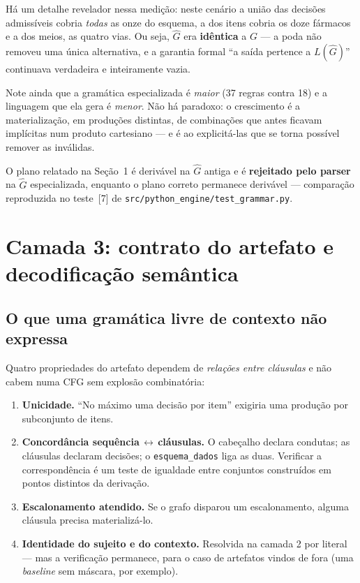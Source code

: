 \documentclass[11pt,a4paper]{article}
\begin{document}
Há um detalhe revelador nessa medição: neste cenário a união das decisões
admissíveis cobria \emph{todas} as onze do esquema, a dos itens cobria os doze
fármacos e a dos meios, as quatro vias. Ou seja, $\hat{G}$ era \textbf{idêntica}
a $G$ --- a poda não removeu uma única alternativa, e a garantia formal ``a saída
pertence a $L(\hat{G})$'' continuava verdadeira e inteiramente vazia.

Note ainda que a gramática especializada é \emph{maior} (37 regras contra 18) e
a linguagem que ela gera é \emph{menor}. Não há paradoxo: o crescimento é a
materialização, em produções distintas, de combinações que antes ficavam
implícitas num produto cartesiano --- e é ao explicitá-las que se torna possível
remover as inválidas.

O plano relatado na Seção~1 é derivável na $\hat{G}$ antiga e é
\textbf{rejeitado pelo parser} na $\hat{G}$ especializada, enquanto o plano
correto permanece derivável --- comparação reproduzida no
teste~[7] de \texttt{src/python\_engine/test\_grammar.py}.

\section{Camada 3: contrato do artefato e decodificação semântica}

\subsection{O que uma gramática livre de contexto não expressa}

Quatro propriedades do artefato dependem de \emph{relações entre cláusulas} e
não cabem numa CFG sem explosão combinatória:

\begin{enumerate}[leftmargin=*,itemsep=1pt]
\item \textbf{Unicidade.} ``No máximo uma decisão por item'' exigiria uma
produção por subconjunto de itens.
\item \textbf{Concordância sequência\,$\leftrightarrow$\,cláusulas.} O cabeçalho
declara condutas; as cláusulas declaram decisões; o \texttt{esquema\_dados} liga
as duas. Verificar a correspondência é um teste de igualdade entre conjuntos
construídos em pontos distintos da derivação.
\item \textbf{Escalonamento atendido.} Se o grafo disparou um escalonamento,
alguma cláusula precisa materializá-lo.
\item \textbf{Identidade do sujeito e do contexto.} Resolvida na camada 2 por
literal --- mas a verificação permanece, para o caso de artefatos vindos de fora
(uma \emph{baseline} sem máscara, por exemplo).
\end{enumerate}
\end{document}
